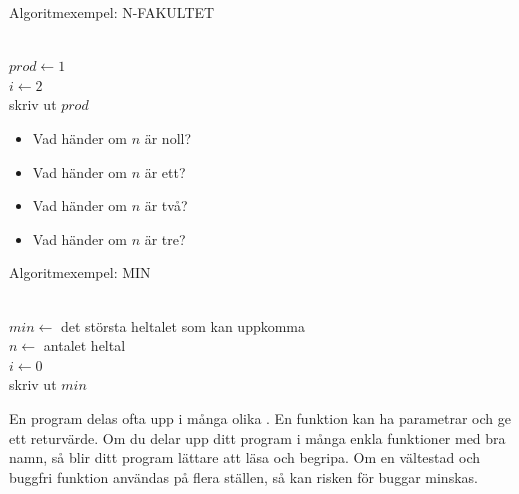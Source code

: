 \fi

\begin{Slide}{Algoritmexempel: N-FAKULTET}
\begin{algorithm}[H]

 ~\\
 $prod \leftarrow 1$ \\
 $i \leftarrow 2$  \\
 skriv ut $prod$
\end{algorithm}
\pause\vspace{1em}
\begin{itemize}\SlideFontSmall
\item Vad händer om $n$ är noll?
\item Vad händer om $n$ är ett?
\item Vad händer om $n$ är två?
\item Vad händer om $n$ är tre?
\end{itemize}
\end{Slide}

\begin{Slide}{Algoritmexempel: MIN}
\begin{algorithm}[H]

 ~\\
 $min \leftarrow$ det största heltalet som kan uppkomma  \\
 $n \leftarrow $ antalet heltal \\
 $i \leftarrow 0$ \\
 skriv ut $min$
\end{algorithm}
\end{Slide}



\ifkompendium
\noindent En program delas ofta upp i många olika . En funktion kan ha parametrar och ge ett returvärde. Om du delar upp ditt program i många enkla funktioner med bra namn, så blir ditt program lättare att läsa och begripa. Om en vältestad och buggfri funktion användas på flera ställen, så kan risken för buggar minskas.
\fi 

